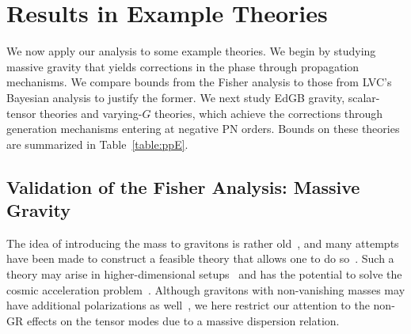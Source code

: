 \documentclass[prd,twocolumn,nofootinbib]{revtex4-1}
\newcommand{\PPE}{{\mbox{\tiny PPE}}}
\newcommand{\ky}[1]{\textcolor{blue}{\it{\textbf{ky: #1}}} }
\newcommand{\kent}[1]{\textcolor{magenta}{\textbf{#1}} }
\begin{document}

\section{Results in Example Theories}\label{results}


We now apply our analysis to some example theories. We begin by studying massive gravity that yields corrections in the phase through propagation mechanisms. We compare bounds from the Fisher analysis to those from LVC's Bayesian analysis to justify the former. We next study EdGB gravity, scalar-tensor theories and varying-$G$ theories, which achieve the corrections through generation mechanisms entering at negative PN orders.
Bounds on these theories are summarized in Table~\ref{table:ppE}.




\subsection{Validation of the Fisher Analysis: Massive Gravity}
\label{sec:massive}


The idea of introducing the mass to gravitons is rather old~\cite{Fierz:1939ix}, and many attempts have been made to construct a feasible theory that allows one to do so~\cite{deRham:2014zqa}.  Such a theory may arise in higher-dimensional setups~\cite{Hinterbichler:2011tt} and has the potential to solve the cosmic acceleration problem~\cite{deRham:2014zqa}. Although gravitons with non-vanishing masses may have additional polarizations as well~\cite{dePaula:2004bc}, we here restrict our attention to the non-GR effects on the tensor modes due to a massive dispersion relation.
\end{document}
